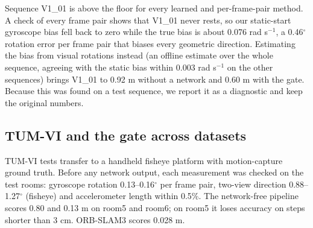 \documentclass[pdflatex,sn-nature]{sn-jnl}
\begin{document}
Sequence V1\_01 is above the floor for every learned and per-frame-pair method. A check of every frame pair shows that V1\_01 never rests, so our static-start gyroscope bias fell back to zero while the true bias is about 0.076 rad s$^{-1}$, a 0.46$^\circ$ rotation error per frame pair that biases every geometric direction. Estimating the bias from visual rotations instead (an offline estimate over the whole sequence, agreeing with the static bias within 0.003 rad s$^{-1}$ on the other sequences) brings V1\_01 to 0.92 m without a network and 0.60 m with the gate. Because this was found on a test sequence, we report it as a diagnostic and keep the original numbers.

\subsection{TUM-VI and the gate across datasets}\label{sec:tumvi}

TUM-VI tests transfer to a handheld fisheye platform with motion-capture ground truth. Before any network output, each measurement was checked on the test rooms: gyroscope rotation 0.13--0.16$^\circ$ per frame pair, two-view direction 0.88--1.27$^\circ$ (fisheye) and accelerometer length within 0.5\%. The network-free pipeline scores 0.80 and 0.13 m on room5 and room6; on room5 it loses accuracy on steps shorter than 3 cm. ORB-SLAM3 scores 0.028 m.
\end{document}

